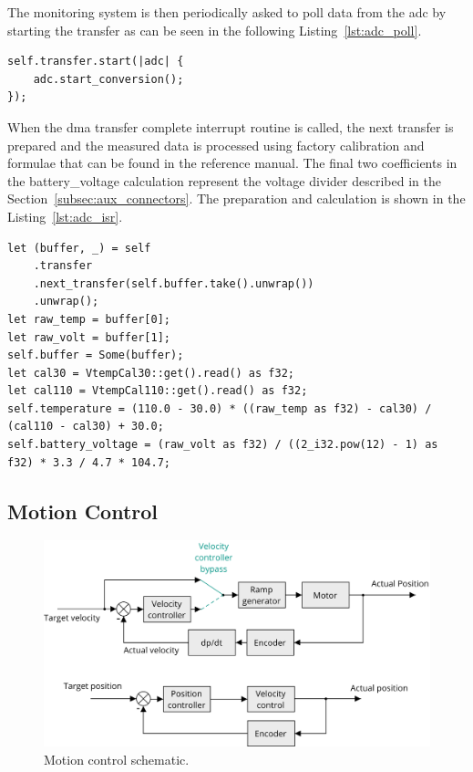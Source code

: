 The monitoring system is then periodically asked to poll data from the \acs{adc} by starting the transfer as can be seen in the following Listing~\ref{lst:adc_poll}.
\begin{lstlisting}[caption={Polling the ADC.},label=lst:adc_poll]
self.transfer.start(|adc| {
    adc.start_conversion();
});
\end{lstlisting}
When the \acs{dma} transfer complete interrupt routine is called, the next transfer is prepared and the measured data is processed using factory calibration and formulae that can be found in the reference manual\cite{stmicro_stm32f405xx_2020}.
The final two coefficients in the battery\_voltage calculation represent the voltage divider described in the Section~\ref{subsec:aux_connectors}.
The preparation and calculation is shown in the Listing~\ref{lst:adc_isr}.
\begin{lstlisting}[caption={Processing the data measured by the ADC.},label=lst:adc_isr]
let (buffer, _) = self
    .transfer
    .next_transfer(self.buffer.take().unwrap())
    .unwrap();
let raw_temp = buffer[0];
let raw_volt = buffer[1];
self.buffer = Some(buffer);
let cal30 = VtempCal30::get().read() as f32;
let cal110 = VtempCal110::get().read() as f32;
self.temperature = (110.0 - 30.0) * ((raw_temp as f32) - cal30) / (cal110 - cal30) + 30.0;
self.battery_voltage = (raw_volt as f32) / ((2_i32.pow(12) - 1) as f32) * 3.3 / 4.7 * 104.7;
\end{lstlisting}

\subsection{Motion Control}
\label{subsec:motion_control}

\begin{figure}[H]
    \centering
    \includegraphics[width=\textwidth]{obrazky/motion_control}
    \caption{Motion control schematic.}
    \label{fig:motion_control}
\end{figure}
